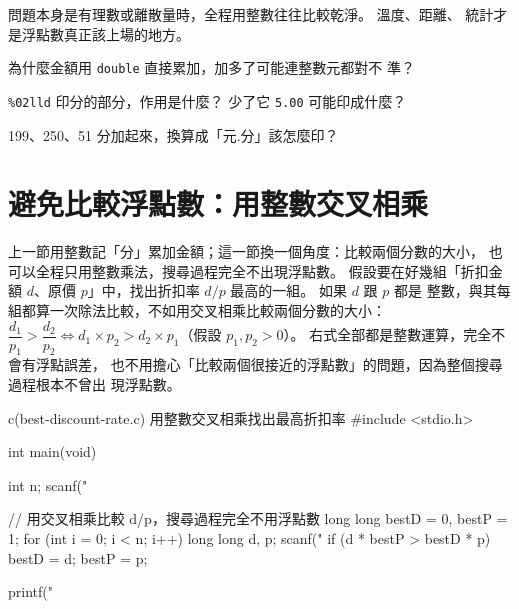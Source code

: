 
問題本身是有理數或離散量時，全程用整數往往比較乾淨。 溫度、距離、
統計才是浮點數真正該上場的地方。

\begin{drills}[label=drills:float-money-int]
\item 為什麼金額用 \texttt{double} 直接累加，加多了可能連整數元都對不
準？
\item \texttt{\%02lld} 印分的部分，作用是什麼？ 少了它 \texttt{5.00}
可能印成什麼？
\item 199、250、51 分加起來，換算成「元.分」該怎麼印？
\end{drills}

\section{避免比較浮點數：用整數交叉相乘}
\label{sec:float-cross-mult}

上一節用整數記「分」累加金額；這一節換一個角度：比較兩個分數的大小，
也可以全程只用整數乘法，搜尋過程完全不出現浮點數。 假設要在好幾組「折扣金額
$d$、原價 $p$」中，找出折扣率 $d / p$ 最高的一組。 如果 $d$ 跟 $p$ 都是
整數，與其每組都算一次除法比較，不如用交叉相乘比較兩個分數的大小：
$\dfrac{d_1}{p_1} > \dfrac{d_2}{p_2} \iff d_1 \times p_2 > d_2 \times
p_1$（假設 $p_1, p_2 > 0$）。 右式全部都是整數運算，完全不會有浮點誤差，
也不用擔心「比較兩個很接近的浮點數」的問題，因為整個搜尋過程根本不曾出
現浮點數。

\begin{example}{c}{(best-discount-rate.c) 用整數交叉相乘找出最高折扣率}
#include <stdio.h>

int main(void) {
    int n;
    scanf("%

    // 用交叉相乘比較 d/p，搜尋過程完全不用浮點數
    long long bestD = 0, bestP = 1;
    for (int i = 0; i < n; i++) {
        long long d, p;
        scanf("%
        if (d * bestP > bestD * p) {
            bestD = d;
            bestP = p;
        }
    }

    printf("%
}
\end{example}


